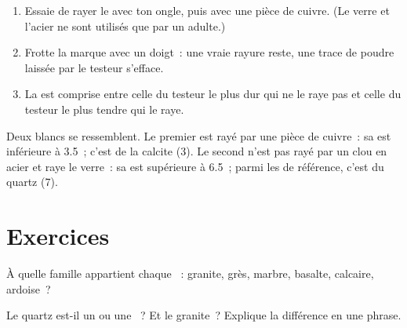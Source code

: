 \begin{method}\label{met:g6:rocks-and-minerals:scratch}
\begin{enumerate}
  \item Essaie de rayer le  avec ton ongle, puis avec une pièce de
        cuivre. (Le verre et l'acier ne sont utilisés que par un adulte.)
  \item Frotte la marque avec un doigt~: une vraie rayure reste, une trace
        de poudre laissée par le testeur s'efface.
  \item La  est comprise entre celle du testeur le plus dur qui ne le
        raye pas et celle du testeur le plus tendre qui le raye.
\end{enumerate}
\end{method}

\begin{example}\label{ex:g6:rocks-and-minerals:quartz-calcite}
Deux  blancs se ressemblent. Le premier est rayé par une pièce de
cuivre~: sa  est inférieure à 3.5~; c'est de la calcite (3). Le
second n'est pas rayé par un clou en acier et raye le verre~: sa 
est supérieure à 6.5~; parmi les  de référence, c'est du quartz
(7).
\end{example}

\section{Exercices}

\begin{exercise}[$\star$]\label{exo:g6:rocks-and-minerals:1}
À quelle famille appartient chaque ~: granite, grès, marbre, basalte,
calcaire, ardoise~?
\end{exercise}

\begin{exercise}[$\star$]\label{exo:g6:rocks-and-minerals:2}
Le quartz est-il un  ou une ~? Et le granite~? Explique la
différence en une phrase.
\end{exercise}

